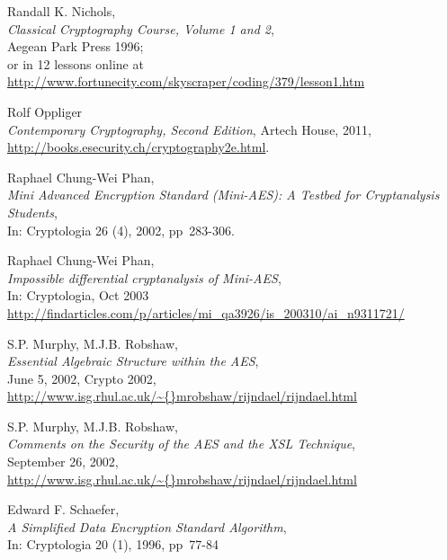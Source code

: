 \begin{thebibliography}{99999}
  
       Randall K. Nichols, \\
       {\em Classical Cryptography Course, Volume 1 and 2}, \\
       Aegean Park Press 1996;\\
       or in 12 lessons online at \\
       \url{http://www.fortunecity.com/skyscraper/coding/379/lesson1.htm}

 
       Rolf Oppliger \\
       {\em Contemporary Cryptography, Second Edition},
       Artech House, 2011, \\
       \url{http://books.esecurity.ch/cryptography2e.html}.

  
       Raphael Chung-Wei Phan, \\
       {\em Mini Advanced Encryption Standard (Mini-AES): A Testbed for
            Cryptanalysis Students}, \\
       In: Cryptologia 26 (4), 2002, pp~283-306.

  
       Raphael Chung-Wei Phan, \\
       {\em Impossible differential cryptanalysis of Mini-AES}, \\
       In: Cryptologia, Oct 2003\\
       \url{http://findarticles.com/p/articles/mi_qa3926/is_200310/ai_n9311721/}

  
       S.P. Murphy, M.J.B. Robshaw, \\
       {\em Essential Algebraic Structure within the AES}, \\
       June 5, 2002, Crypto 2002,  \\
       \url{http://www.isg.rhul.ac.uk/\~{}mrobshaw/rijndael/rijndael.html}

  
       S.P. Murphy, M.J.B. Robshaw, \\
       {\em Comments on the Security of the AES and the XSL Technique}, \\
       September 26, 2002, \\
       \url{http://www.isg.rhul.ac.uk/\~{}mrobshaw/rijndael/rijndael.html}

  
       Edward F. Schaefer, \\
       {\em A Simplified Data Encryption Standard Algorithm}, \\
       In: Cryptologia 20 (1), 1996, pp~77-84


\end{thebibliography}
